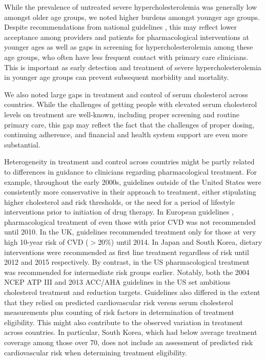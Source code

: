 \documentclass[12pt]{article}
\begin{document}
\begin{refsection}
While the prevalence of untreated severe hypercholesterolemia was generally low amongst older age groups, we noted higher burdens amongst younger age groups. Despite recommendations from national guidelines \cite{piepoli_2016_2016,de_backer_european_2003,mach_2019_2020,grundy_scott_m_2018_2019,stone_2013_2014,noauthor_third_2002,kinoshita_japan_2018,rhee_2018_2019,rabar_lipid_2014}, this may reflect lower acceptance among providers and patients for pharmacological interventions at younger ages as well as gaps in screening for hypercholesterolemia among these age groups, who often have less frequent contact with primary care clinicians. This is important as early detection and treatment of severe hypercholesterolemia in younger age groups can prevent subsequent morbidity and mortality.

We also noted large gaps in treatment and control of serum cholesterol across countries. While the challenges of getting people with elevated serum cholesterol levels on treatment are well-known, including proper screening and routine primary care, this gap may reflect the fact that the challenges of proper dosing, continuing adherence, and financial and health system support are even more substantial. 

Heterogeneity in treatment and control across countries might be partly related to differences in guidance to clinicians regarding pharmacological treatment. For example, throughout the early 2000s, guidelines outside of the United States were consistently more conservative in their approach to treatment, either stipulating higher cholesterol and risk thresholds, or the need for a period of lifestyle interventions prior to initiation of drug therapy. In European guidelines \cite{pyorala_prevention_1994,wood_prevention_1998,de_backer_european_2003,graham_european_2007}, pharmacological treatment of even those with prior CVD was not recommended until 2010. In the UK, guidelines \cite{shepherd_strategies_1987,betteridge_management_1993,society_joint_1998,society_jbs_2005} recommended  treatment only for those at very high 10-year risk of CVD ($>$20\%) until 2014. In Japan and South Korea, dietary interventions were recommended as first line treatment regardless of risk until 2012 and 2015 respectively. By contrast, in the US pharmacological treatment was recommended for intermediate risk groups earlier. Notably, both the 2004 NCEP ATP III \cite{noauthor_third_2002} and 2013 ACC/AHA guidelines \cite{stone_2013_2014} in the US set ambitious cholesterol treatment and reduction targets. Guidelines also differed in the extent that they relied on predicted cardiovascular risk versus serum cholesterol measurements plus counting of risk factors in determination of treatment eligibility. This might also contribute to the observed variation in treatment across countries. In particular, South Korea, which had below average treatment coverage among those over 70, does not include an assessment of predicted risk cardiovascular risk when determining treatment eligibility.


\end{refsection}
\end{document}
